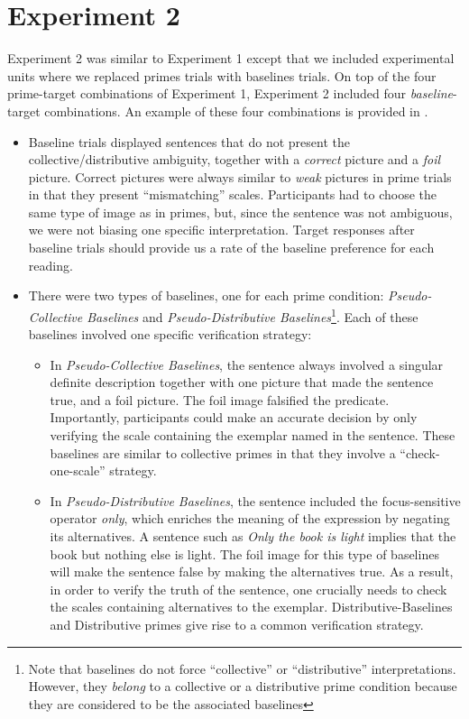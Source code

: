 \documentclass[a4paper, 11pt]{article}
\begin{document}
\section{Experiment 2}

Experiment 2 was similar to Experiment 1 except that we included experimental units where we replaced primes trials with baselines trials. On top of the four prime-target combinations of Experiment 1, Experiment 2 included four \emph{baseline}-target combinations. An example of these four combinations is provided in . 

\begin{itemize}
\item Baseline trials displayed sentences that do not present the collective/distributive ambiguity, together with a \emph{correct} picture and a \emph{foil} picture. Correct pictures were always similar to \emph{weak} pictures in prime trials in that they present ``mismatching'' scales. Participants had to choose the same type of image as in primes, but, since the sentence was not ambiguous, we were not biasing one specific interpretation. 
Target responses after baseline trials should provide us a rate of the baseline preference for each reading.  

\item There were two types of baselines, one for each prime condition: \emph{Pseudo-Collective Baselines} and \emph{Pseudo-Distributive Baselines}\footnote{Note that baselines do not force ``collective'' or ``distributive'' interpretations. However, they \emph{belong} to a collective or a distributive prime condition because they are considered to be the associated baselines}. Each of these baselines involved one specific verification strategy:
\begin{itemize}
\item In \textit{Pseudo-Collective Baselines}, the sentence always involved a singular definite description together with one picture that made the sentence true, and a foil picture. The foil image falsified the predicate. Importantly, participants could make an accurate decision by only verifying the scale containing the exemplar named in the sentence. These baselines are similar to collective primes in that they involve a ``check-one-scale'' strategy. 
\item In \textit{Pseudo-Distributive Baselines}, the sentence included the focus-sensitive operator \emph{only}, which enriches the meaning of the expression by negating its alternatives. A sentence such as \textit{Only the book is light} implies that the book but nothing else is light.  The foil image for this type of baselines will make the sentence false by making the alternatives true. As a result, in order to verify the truth of the sentence, one crucially needs to check the scales containing alternatives to the exemplar. Distributive-Baselines and  Distributive primes give rise to a common verification strategy. 
\end{itemize} 


\end{itemize}
\end{document}
